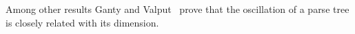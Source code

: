 \documentclass[runningheads]{llncs}
\begin{document}

Among other results Ganty and Valput~\cite{BoundOsc}
prove that the oscillation of a parse tree is closely related with its dimension.
\end{document}
